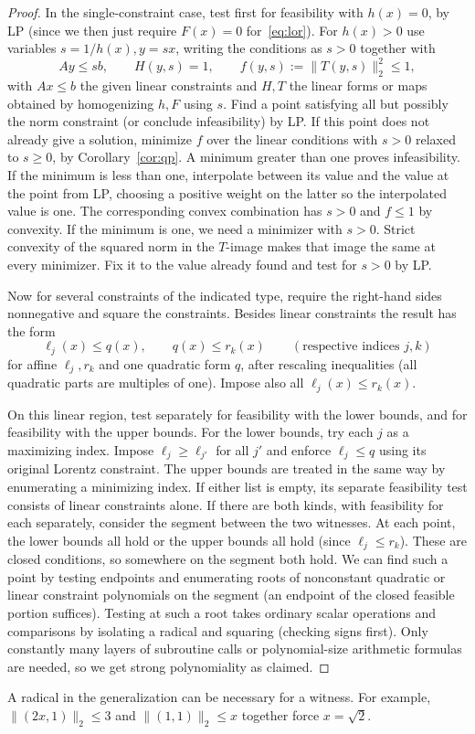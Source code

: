 \begin{proof}
In the single-constraint case,
test first for feasibility with \(h(x)=0\), by LP
(since we then just require \(F(x)=0\) for~\eqref{eq:lor}).
For \(h(x)>0\) use variables \(s=1/h(x),y=sx\),
writing the conditions as \(s>0\)
together with
\[
 Ay\le sb,\qquad H(y,s)=1,\qquad f(y,s):=\|T(y,s)\|_2^2\le1,
\]
with \(Ax\le b\) the given linear constraints and \(H,T\)
the linear forms or maps obtained by homogenizing
\(h,F\) using \(s\).
Find a point satisfying all but possibly the norm constraint
(or conclude infeasibility) by LP.
If this point does not already give a solution,
minimize \(f\) over the linear conditions with \(s>0\)
relaxed to \(s\ge0\),
by Corollary~\ref{cor:qp}.
A minimum greater than one proves infeasibility. If the minimum
is less than one, interpolate between its value and the value at the
point from LP, choosing a positive weight on the latter so the
interpolated value is one. The corresponding convex combination has
\(s>0\) and \(f\le1\) by convexity. If the minimum is one, we need
a minimizer with \(s>0\). Strict convexity of the squared norm in
the \(T\)-image makes that image the same at every minimizer.
Fix it to the value already found and test for \(s>0\) by LP.


Now for several constraints of the indicated type,
require the right-hand sides nonnegative and square the constraints.
Besides linear constraints the result has the form
\[
 \ell_j(x)\le q(x),\qquad q(x)\le r_k(x)\qquad(\text{respective indices }j,k)
\]
for affine \(\ell_j,r_k\) and one quadratic form \(q\),
after rescaling inequalities (all quadratic parts
are multiples of one).
Impose also all \(\ell_j(x)\le r_k(x)\).

On this linear region, test separately for feasibility with the
lower bounds, and for feasibility with the upper bounds.
For the lower bounds, try each \(j\) as a maximizing index. Impose
\(\ell_j\ge\ell_{j'}\) for all \(j'\) and enforce \(\ell_j\le q\)
using its original Lorentz constraint. The upper bounds are treated
in the same way by enumerating a minimizing index. If either list
is empty, its separate feasibility test consists of linear
constraints alone.
If there are both kinds, with feasibility for each separately,
consider the segment between the two witnesses. At each point, the lower
bounds all hold or the upper bounds all hold (since \(\ell_j\le r_k\)).
These are closed conditions, so somewhere on the segment both hold.
We can find such a point by testing endpoints and enumerating roots
of nonconstant quadratic or linear constraint polynomials on the
segment (an endpoint of the closed feasible portion suffices).
Testing at such a root takes ordinary scalar operations and comparisons
by isolating a radical and squaring (checking signs first).
Only constantly many layers of subroutine calls
or polynomial-size arithmetic formulas are needed,
so we get strong polynomiality as claimed.
\end{proof}

A radical in the generalization can be necessary for a witness.
For example, \(\|(2x,1)\|_2\le3\) and
\(\|(1,1)\|_2\le x\) together force \(x=\sqrt2\).
